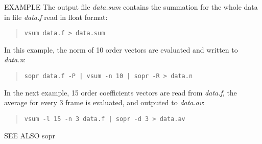 \begin{options}
\end{options}

\begin{qsection}{EXAMPLE}
The output file {\em data.sum} contains the summation for
the whole data in file {\em data.f} read in float format:
\begin{quote}
  \verb!vsum data.f > data.sum!
\end{quote}
\par
In this example, the norm of 10 order vectors are
evaluated and written to {\em data.n}:
\begin{quote}
  \verb!sopr data.f -P | vsum -n 10 | sopr -R > data.n!
\end{quote}
\par
In the next example, 15 order coefficients vectors are read
from {\em data.f}, the average for every 3 frame is evaluated,
and outputed to {\em data.av}:
\begin{quote}
  \verb!vsum -l 15 -n 3 data.f | sopr -d 3 > data.av!
\end{quote}
\end{qsection}

\begin{qsection}{SEE ALSO}
  sopr
\end{qsection}
